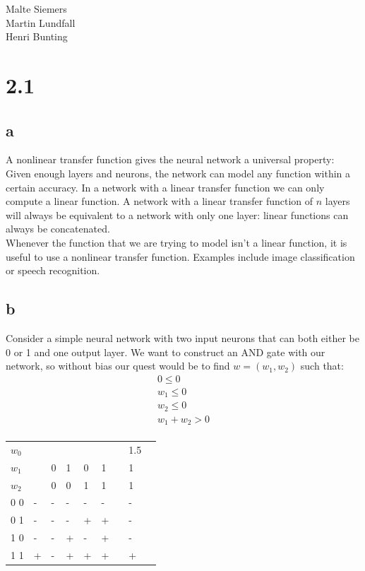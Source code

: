 \documentclass[11pt,a4paper]{article}
\begin{document}
Malte Siemers\\
Martin Lundfall\\
Henri Bunting\\
\section*{2.1}
\subsection*{a}
A nonlinear transfer function gives the neural network a universal property: Given enough layers and neurons, the network can model any function within a certain accuracy. In a network with a linear transfer function we can only compute a linear function. A network with a linear transfer function of $n$ layers will always be equivalent to a network with only one layer: linear functions can always be concatenated.\\
Whenever the function that we are trying to model isn't a linear function, it is useful to use a nonlinear transfer function.
Examples include image classification or speech recognition.
\subsection*{b}
Consider a simple neural network with two input neurons that can both either be 0 or 1 and one output layer. We want to construct an AND gate with our network, so without bias our quest would be to find $w = (w_1, w_2)$ such that:
\begin{align*}
  0 \leq 0\\
  w_1 \leq 0\\
  w_2 \leq 0\\
  w_1 + w_2 > 0\\
\end{align*}

\begin{tabular}{ l | l | l | l | l | l | l | l | l }
$w_0 $ & &   &   &   &   &  & 1.5 \\
$w_1 $ & & 0 & 1 & 0 & 1 &  & 1  \\
$w_2 $ & & 0 & 0 & 1 & 1 &  & 1  \\ \hline
0 0  & - & - & - & - & - &  & -  \\
0 1  & - & - & - & + & + &  & -  \\
1 0  & - & - & + & - & + &  & -  \\
1 1  & + & - & + & + & + &  & +\\ \hline
\end{tabular} \\
	
\end{document}

